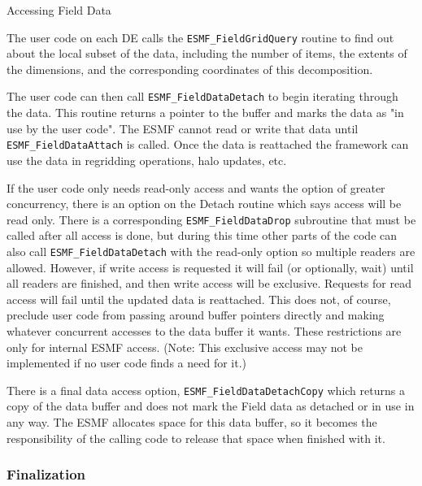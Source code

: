 \begin{description}

\item{Accessing Field Data}

The user code on each DE calls the {\tt ESMF\_FieldGridQuery}
routine to find out about the local subset of the data, including
the number of items, the extents
of the dimensions, and the corresponding coordinates of this
decomposition.

The user code can then call {\tt ESMF\_FieldDataDetach} to
begin iterating through the data.  This routine returns a
pointer to the buffer and marks the data as "in use by
the user code".  The ESMF cannot read or write that
data until {\tt ESMF\_FieldDataAttach} is called.  Once the data
is reattached the framework can use the data in regridding 
operations, halo updates, etc.  

If the user code only needs read-only access and wants
the option of greater concurrency, there is an option on the
Detach routine which says access will be read only.  There is
a corresponding {\tt ESMF\_FieldDataDrop} subroutine that must be called
after all access is done, but during this time other parts of
the code can also call {\tt ESMF\_FieldDataDetach} with the read-only
option so multiple readers are allowed.  However, if write access
is requested it will fail (or optionally, wait) until all readers 
are finished, and
then write access will be exclusive.   Requests for read access
will fail until the updated data is reattached. 
This does not, of course, preclude user code from passing around
buffer pointers directly and making whatever concurrent accesses to the
data buffer it wants.  These restrictions are only for internal
ESMF access.
(Note: This exclusive access may not be implemented if no user
code finds a need for it.)

There is a final data access option, {\tt ESMF\_FieldDataDetachCopy}
which returns a copy of the data buffer and does not mark the
Field data as detached or in use in any way.  The ESMF 
allocates space for this data buffer, so it becomes the
responsibility of the calling code to release that space 
when finished with it.

\end{description}

\subsubsection{Finalization}

